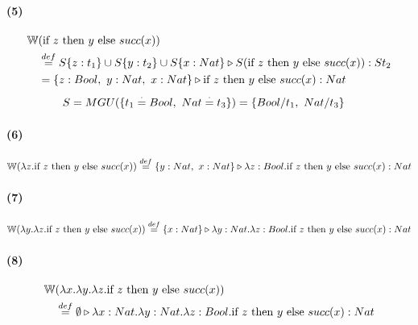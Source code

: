 \documentclass[10pt,a4paper]{article}
\begin{document}
\vspace*{5mm}

\paragraph{(5)} 
\begin{align*}
\mathbb{W}&(\text{if } z \text{ then } y \text{ else } succ(x)) \\
&\overset{def}{=} S\{z:t_1\} \cup S\{y:t_2\}\cup S\{x:Nat\}\triangleright S(\text{if } z \text{ then } y \text{ else } succ(x)) : St_2 \\
& = \{z:Bool,~y:Nat,~x:Nat\}\triangleright \text{if } z \text{ then } y \text{ else } succ(x) : Nat
\end{align*}
\begin{align*}
S &= MGU(\{t_1 \overset{\cdot}{=} Bool,~Nat \overset{\cdot}{=} t_3\}) = \{Bool/t_1,~Nat/t_3\}
\end{align*}

\paragraph{(6)} 
\begin{align*}
\mathbb{W}(\lambda z\text{.} \text{if } z \text{ then } y \text{ else } succ(x))
\overset{def}{=} \{y:Nat,~x:Nat\}\triangleright \lambda z: Bool \text{.} \text{if } z \text{ then } y \text{ else } succ(x) : Nat
\end{align*}

\paragraph{(7)}
\begin{align*}
\mathbb{W}(\lambda y\text{.} \lambda z\text{.} \text{if } z \text{ then } y \text{ else } succ(x))
\overset{def}{=} \{x:Nat\}\triangleright \lambda y: Nat \text{.} \lambda z: Bool \text{.} \text{if } z \text{ then } y \text{ else } succ(x) : Nat
\end{align*}

\paragraph{(8)}
\begin{align*}
\mathbb{W}&(\lambda x\text{.} \lambda y\text{.} \lambda z\text{.} \text{if } z \text{ then } y \text{ else } succ(x)) \\
&\overset{def}{=} \emptyset\triangleright \lambda x: Nat \text{.} \lambda y: Nat \text{.} \lambda z: Bool \text{.} \text{if } z \text{ then } y \text{ else } succ(x) : Nat
\end{align*}
\end{document}
